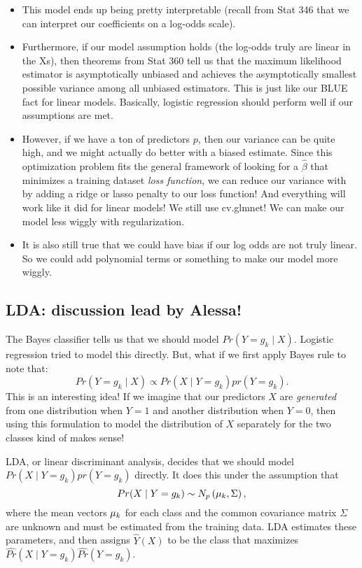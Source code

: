 \begin{itemize}
\item This model ends up being pretty interpretable (recall from Stat 346 that we can interpret our coefficients on a log-odds scale).
\item Furthermore, if our model assumption holds (the log-odds truly are linear in the Xs), then theorems from Stat 360 tell us that the maximum likelihood estimator is asymptotically unbiased and achieves the asymptotically smallest possible variance among all unbiased estimators. This is just like our BLUE fact for linear models. Basically, logistic regression should perform well if our assumptions are met. 
\item However, if we have a ton of predictors $p$, then our variance can be quite high, and we might actually do better with a biased estimate. Since this optimization problem fits the general framework of looking for a $\hat{\beta}$ that minimizes a training  dataset \emph{loss function}, we can reduce our variance with by adding a ridge or lasso penalty to our loss function! And everything will work like it did for linear models! We still use cv.glmnet! We can make our model less wiggly with regularization. 
\item It is also still true that we could have bias if our log odds are not truly linear. So we could add polynomial terms or something to make our model more wiggly. 
\end{itemize}

\subsection{LDA: discussion lead by Alessa!}

The Bayes classifier tells us that we should model $Pr(Y=g_k \mid X)$. Logistic regression tried to model this directly. But, what if we first apply Bayes rule to note that:
$$
Pr(Y=g_k \mid X) \propto Pr(X \mid Y=g_k) pr(Y=g_k). 
$$
This is an interesting idea! If we imagine that our predictors $X$ are \emph{generated} from one distribution when $Y=1$ and another distribution when $Y=0$, then using this formulation to model the distribution of $X$ separately for the two classes kind of makes sense!

LDA, or linear discriminant analysis, decides that we should model $Pr(X \mid Y=g_k) pr(Y=g_k)$ directly. It does this under the assumption that 
$$
Pr(X \mid Y=g_k)  \sim N_p \left(\bold{\mu}_k, \Sigma\right),
$$
where the mean vectors $\bold{\mu}_k$ for each class and the common covariance matrix $\Sigma$ are unknown and must be estimated from the training data. LDA estimates these parameters, and then assigns $\hat{Y}(X)$ to be the class that maximizes $\widehat{Pr}(X \mid Y=g_k)\widehat{Pr}(Y=g_k)$. 

